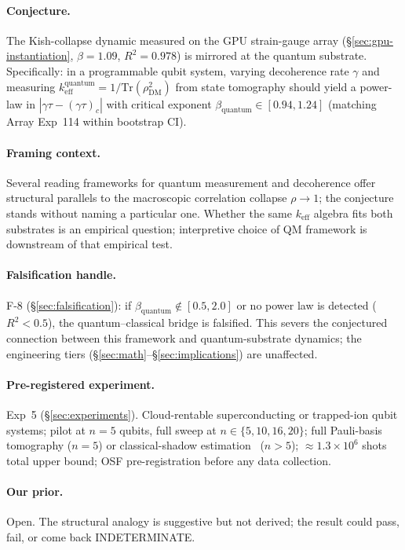 \documentclass[11pt,a4paper]{article}
\begin{document}
\paragraph{Conjecture.} The Kish-collapse dynamic measured on the GPU strain-gauge array (\S\ref{sec:gpu-instantiation}, $\beta = 1.09$, $R^2 = 0.978$) is mirrored at the quantum substrate. Specifically: in a programmable qubit system, varying decoherence rate $\gamma$ and measuring $k_{\text{eff}}^{\text{quantum}} = 1/\mathrm{Tr}(\rho_{\text{DM}}^2)$ from state tomography should yield a power-law in $|\gamma\tau - (\gamma\tau)_c|$ with critical exponent $\beta_{\text{quantum}} \in [0.94, 1.24]$ (matching Array Exp~114 within bootstrap CI).

\paragraph{Framing context.} Several reading frameworks for quantum measurement and decoherence offer structural parallels to the macroscopic correlation collapse $\rho \to 1$; the conjecture stands without naming a particular one. Whether the same $k_{\text{eff}}$ algebra fits both substrates is an empirical question; interpretive choice of QM framework is downstream of that empirical test.

\paragraph{Falsification handle.} F-8 (\S\ref{sec:falsification}): if $\beta_{\text{quantum}} \notin [0.5, 2.0]$ or no power law is detected ($R^2 < 0.5$), the quantum--classical bridge is falsified. This severs the conjectured connection between this framework and quantum-substrate dynamics; the engineering tiers (\S\ref{sec:math}--\S\ref{sec:implications}) are unaffected.

\paragraph{Pre-registered experiment.} Exp~5 (\S\ref{sec:experiments}). Cloud-rentable superconducting or trapped-ion qubit systems; pilot at $n=5$ qubits, full sweep at $n \in \{5, 10, 16, 20\}$; full Pauli-basis tomography ($n=5$) or classical-shadow estimation~\cite{huang_shadow} ($n > 5$); $\approx 1.3 \times 10^6$ shots total upper bound; OSF pre-registration before any data collection.

\paragraph{Our prior.} Open. The structural analogy is suggestive but not derived; the result could pass, fail, or come back INDETERMINATE.
\end{document}
